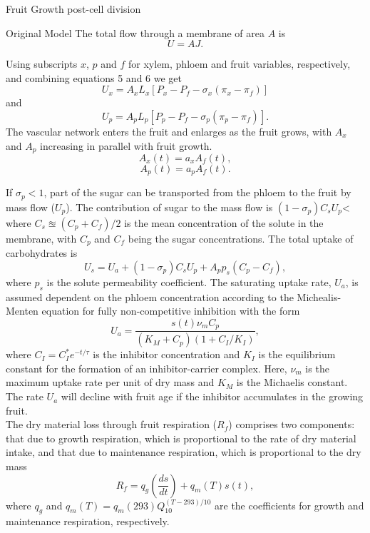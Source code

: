 \begin{section}{Fruit Growth post-cell division}
\begin{subsection}{Original Model}
The total flow through a membrane of area $A$ is
\begin{equation}
U=AJ.
\end{equation}

Using subscripts $x$, $p$ and $f$ for xylem, phloem and fruit variables, respectively, and combining equations 5 and 6 we get
\begin{equation}
U_x=A_xL_x[P_x-P_f-\sigma_x(\pi_x-\pi_f)]
\end{equation}
and
\begin{equation}
U_p=A_pL_p[P_p-P_f-\sigma_p(\pi_p-\pi_f)].
\end{equation}
The vascular network enters the fruit and enlarges as the fruit grows, with $A_x$ and $A_p$ increasing in parallel with fruit growth. 
$$A_x(t)=a_xA_f(t),$$
$$A_p(t)=a_pA_f(t).$$

If $\sigma_p<1$, part of the sugar can be transported from the phloem to the fruit by mass flow ($U_p$). The contribution of sugar to the mass flow is $(1-\sigma_p)C_sU_p$< where $C_s\approxeq (C_p+C_f)/2$ is the mean concentration of the solute in the membrane, with $C_p$ and $C_f$ being the sugar concentrations. The total uptake of carbohydrates is
\begin{equation}
U_s=U_a+(1-\sigma_p)C_sU_p+A_pp_s(C_p-C_f),
\end{equation}
where $p_s$ is the solute permeability coefficient. The saturating uptake rate, $U_a$, is assumed dependent on the phloem concentration according to the Michealis-Menten equation for fully non-competitive inhibition with the form
\begin{equation}
U_a=\frac{s(t)\nu_mC_p}{(K_M+C_p)(1+C_I/K_I)},
\end{equation}
where $C_I=C_I^*e^{-t/\tau}$ is the inhibitor concentration and $K_I$ is the equilibrium constant for the formation of an inhibitor-carrier complex. Here, $\nu_m$ is the maximum uptake rate per unit of dry mass and $K_M$ is the Michaelis constant. The rate $U_a$ will decline with fruit age if the inhibitor accumulates in the growing fruit.\\

The dry material loss through fruit respiration ($R_f$) comprises two components: that due to growth respiration, which is proportional to the rate of dry material intake, and that due to maintenance respiration, which is proportional to the dry mass
\begin{equation}
R_f=q_g\left(\frac{ds}{dt}\right)+q_m(T)s(t),
\end{equation}
where $q_g$ and $q_m(T)=q_m(293)Q_{10}^{(T-293)/10}$ are the coefficients for growth and maintenance respiration, respectively.
\end{subsection}
\end{section}
 